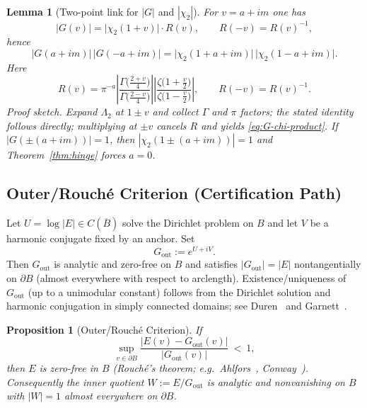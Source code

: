 \documentclass[11pt]{article}
\numberwithin{equation}{section}
\newtheorem{lemma}[theorem]{Lemma}
\newtheorem{proposition}[theorem]{Proposition}
\theoremstyle{remark}
\newcommand{\LamTwo}{\Lambda_2}
\newcommand{\Gout}{G_{\mathrm{out}}}
\begin{document}
\begin{lemma}[Two-point link for $|G|$ and $|\chi_2|$]\label{lem:G-chi-link}
For $v=a+im$ one has
\begin{equation}\label{eq:G-chi-link}
|G(v)|=\big|\chi_2(1+v)\big|\cdot R(v),\qquad R(-v)=R(v)^{-1},
\end{equation}
hence
\begin{equation}\label{eq:G-chi-product}
|G(a+im)|\,|G(-a+im)|
=\big|\chi_2(1+a+im)\big|\,\big|\chi_2(1-a+im)\big|.
\end{equation}
Here
\[
R(v)=\pi^{-a}\left|\frac{\Gamma\!\Big(\frac{2+v}{4}\Big)}{\Gamma\!\Big(\frac{2-v}{4}\Big)}\right|
\left|\frac{\zeta\!\big(1+\tfrac{v}{2}\big)}{\zeta\!\big(1-\tfrac{v}{2}\big)}\right|,
\qquad R(-v)=R(v)^{-1}.
\]
\emph{Proof sketch.}
Expand $\LamTwo$ at $1\pm v$ and collect $\Gamma$ and $\pi$ factors; the stated identity follows directly; multiplying at $\pm v$ cancels $R$ and yields \eqref{eq:G-chi-product}. If $|G(\pm(a+im))|=1$, then $|\chi_2(1\pm(a+im))|=1$ and Theorem~\ref{thm:hinge} forces $a=0$.
\end{lemma}

\subsection{Outer/Rouch\'e Criterion (Certification Path)}\label{subsec:rouche-criterion}

Let $U=\log|E|\in C(\overline B)$ solve the Dirichlet problem on $B$ and let $V$ be a harmonic conjugate fixed by an anchor. Set
\[
\Gout:=e^{U+iV}.
\]
Then $\Gout$ is analytic and zero-free on $B$ and satisfies $|\Gout|=|E|$ nontangentially on $\partial B$ (almost everywhere with respect to arclength). Existence/uniqueness of $\Gout$ (up to a unimodular constant) follows from the Dirichlet solution and harmonic conjugation in simply connected domains; see Duren~\cite[§II.5]{DurenHp} and Garnett~\cite[§II.2]{GarnettBAF}.

\begin{proposition}[Outer/Rouch\'e Criterion]\label{prop:rouche-criterion}
If
\begin{equation}\label{eq:rouche-ratio}
\sup_{v\in\partial B}\frac{|E(v)-\Gout(v)|}{|\Gout(v)|}\ <\ 1,
\end{equation}
then $E$ is zero-free in $B$ (Rouch\'e's theorem; e.g.\ Ahlfors~\cite[§§5--6]{Ahlfors}, Conway~\cite[Ch.~VI]{Conway}). Consequently the inner quotient $W:=E/\Gout$ is analytic and nonvanishing on $B$ with $|W|=1$ almost everywhere on $\partial B$.
\end{proposition}
\end{document}
